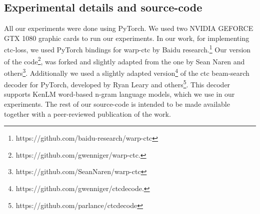\documentclass[conference]{IEEEtran}
\begin{document}
\subsection{Experimental details and source-code}
\label{appendix:code}
All our experiments were done using PyTorch. We used two NVIDIA GEFORCE\textsuperscript{\textregistered} GTX 1080 graphic cards to run our experiments.
In our work, for implementing ctc-loss, we used PyTorch bindings for warp-ctc \cite{deep-speech2016} by Baidu research.\footnote{https://github.com/baidu-research/warp-ctc}
Our version of the code\footnote{https://github.com/gwenniger/warp-ctc.}, was forked and slightly adapted from the one by Sean Naren and others\footnote{https://github.com/SeanNaren/warp-ctc}.
Additionally we used a slightly adapted version\footnote{https://github.com/gwenniger/ctcdecode.} of the ctc beam-search decoder for PyTorch, 
developed by Ryan Leary and others\footnote{https://github.com/parlance/ctcdecode}.
This decoder supports KenLM \cite{Heafield-kenlm} word-based n-gram
language models, which we use in our experiments. The rest of our source-code is intended to be made available together with a peer-reviewed publication of the work.
\end{document}

